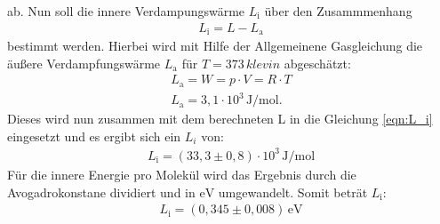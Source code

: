 ab.
Nun soll die innere Verdampungswärme $L_\mathrm{i}$
über den Zusammmenhang
\begin{align}
L_\mathrm{i}=L-L_\mathrm{a}\label{eqn:L_i}
\end{align}
bestimmt werden.
Hierbei wird mit Hilfe der Allgemeinene Gasgleichung
die äußere Verdampfungswärme $L_\mathrm{a}$
für $T = 373\,\si{klevin}$
abgeschätzt:
\begin{align*}
  L_\mathrm{a}=W=p\cdot V=R\cdot T\\
  L_\mathrm{a}=3,1\cdot10^3\,\si{\joule\per\mol}.
\end{align*}
Dieses wird nun zusammen mit dem berechneten L in die
Gleichung \eqref{eqn:L_i} eingesetzt und es ergibt sich ein
$L_i$ von:
\begin{align*}
L_\mathrm{i}=(33,3\pm0,8)\cdot10^3\,\si{\joule\per\mol}
\end{align*}
Für die innere Energie pro Molekül wird das Ergebnis
durch die Avogadrokonstane dividiert und
in $\si{\electronvolt}$ umgewandelt. Somit beträt $L_\mathrm{i}$:
\begin{align*}
L_\mathrm{i}=(0,345\pm0,008)\,\si{\electronvolt}
\end{align*}




